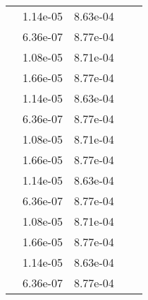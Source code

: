\begin{table}
\begin{tabular}{c|cc|cc|}
\multicolumn{1}{|c|}{} & \multicolumn{1}{|c|}{  1.14e-05} & \multicolumn{1}{|c|}{  8.63e-04} & \multicolumn{1}{|c|}{} & \multicolumn{1}{|c|}{} \\ 
\multicolumn{1}{|c|}{} & \multicolumn{1}{|c|}{  6.36e-07} & \multicolumn{1}{|c|}{  8.77e-04} & \multicolumn{1}{|c|}{} & \multicolumn{1}{|c|}{} \\ 
\multicolumn{1}{|c|}{} & \multicolumn{1}{|c|}{  1.08e-05} & \multicolumn{1}{|c|}{  8.71e-04} & \multicolumn{1}{|c|}{} & \multicolumn{1}{|c|}{} \\ 
\multicolumn{1}{|c|}{} & \multicolumn{1}{|c|}{  1.66e-05} & \multicolumn{1}{|c|}{  8.77e-04} & \multicolumn{1}{|c|}{} & \multicolumn{1}{|c|}{} \\ 
\multicolumn{1}{|c|}{} & \multicolumn{1}{|c|}{  1.14e-05} & \multicolumn{1}{|c|}{  8.63e-04} & \multicolumn{1}{|c|}{} & \multicolumn{1}{|c|}{} \\ 
\multicolumn{1}{|c|}{} & \multicolumn{1}{|c|}{  6.36e-07} & \multicolumn{1}{|c|}{  8.77e-04} & \multicolumn{1}{|c|}{} & \multicolumn{1}{|c|}{} \\ 
\multicolumn{1}{|c|}{} & \multicolumn{1}{|c|}{  1.08e-05} & \multicolumn{1}{|c|}{  8.71e-04} & \multicolumn{1}{|c|}{} & \multicolumn{1}{|c|}{} \\ 
\multicolumn{1}{|c|}{} & \multicolumn{1}{|c|}{  1.66e-05} & \multicolumn{1}{|c|}{  8.77e-04} & \multicolumn{1}{|c|}{} & \multicolumn{1}{|c|}{} \\ 
\multicolumn{1}{|c|}{} & \multicolumn{1}{|c|}{  1.14e-05} & \multicolumn{1}{|c|}{  8.63e-04} & \multicolumn{1}{|c|}{} & \multicolumn{1}{|c|}{} \\ 
\multicolumn{1}{|c|}{} & \multicolumn{1}{|c|}{  6.36e-07} & \multicolumn{1}{|c|}{  8.77e-04} & \multicolumn{1}{|c|}{} & \multicolumn{1}{|c|}{} \\ 
\multicolumn{1}{|c|}{} & \multicolumn{1}{|c|}{  1.08e-05} & \multicolumn{1}{|c|}{  8.71e-04} & \multicolumn{1}{|c|}{} & \multicolumn{1}{|c|}{} \\ 
\multicolumn{1}{|c|}{} & \multicolumn{1}{|c|}{  1.66e-05} & \multicolumn{1}{|c|}{  8.77e-04} & \multicolumn{1}{|c|}{} & \multicolumn{1}{|c|}{} \\ 
\multicolumn{1}{|c|}{} & \multicolumn{1}{|c|}{  1.14e-05} & \multicolumn{1}{|c|}{  8.63e-04} & \multicolumn{1}{|c|}{} & \multicolumn{1}{|c|}{} \\ 
\multicolumn{1}{|c|}{} & \multicolumn{1}{|c|}{  6.36e-07} & \multicolumn{1}{|c|}{  8.77e-04} & \multicolumn{1}{|c|}{} & \multicolumn{1}{|c|}{} \\ 

\end{tabular}
\end{table}
